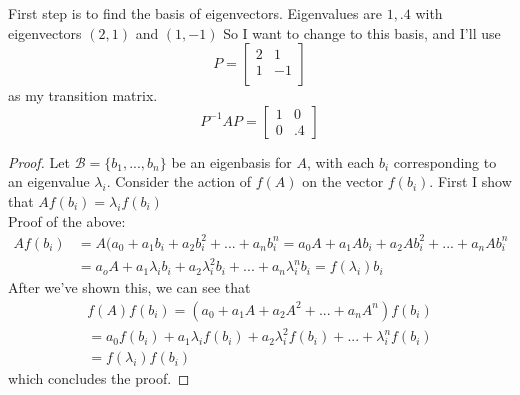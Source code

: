 \documentclass[12pt]{amsart}
\newenvironment{problem}[2][Problem]{\begin{trivlist}
\item[\hskip \labelsep {\bfseries #1}\hskip \labelsep {\bfseries #2.}]}{\end{trivlist}}
\begin{document}
\begin{problem}{13}
First step is to find the basis of eigenvectors. Eigenvalues are $1, .4$ with eigenvectors $(2, 1)$ and $(1, -1)$ So I want to change to this basis, and I'll use
$$
P = \begin{bmatrix}
2 & 1 \\
1 & -1\\
\end{bmatrix}
$$
as my transition matrix.
$$
P^{-1}AP = \begin{bmatrix}
1 & 0 \\
0 & .4
\end{bmatrix}
$$
\end{problem}

\begin{problem}{15}
\begin{proof}
Let $\mathcal{B} = \{b_1, ..., b_n\}$ be an eigenbasis for $A$, with each $b_i$ corresponding to an eigenvalue $\lambda_i$. Consider the action of $f(A)$ on the vector $f(b_i)$. First I show that $Af(b_i) = \lambda_i f(b_i)$ \\
Proof of the above:
\begin{align*}
Af(b_i) &= A(a_0 + a_1b_i + a_2b_i^2 +... +a_nb_i^n = a_0A + a_1Ab_i + a_2Ab_i^2 + ... +a_nAb_i^n \\
&= a_oA + a_1 \lambda_i b_i + a_2 \lambda_i^2 b_i +  ... + a_n \lambda_i^n b_i = f(\lambda_i)b_i
\end{align*}
After we've shown this, we can see that
\begin{align*}
f(A)f(b_i) = (a_0 + a_1A + a_2A^2 + ... + a_nA^n)f(b_i) \\
= a_0f(b_i) + a_1 \lambda_i f(b_i) + a_2 \lambda_i^2 f(b_i) + ... + \lambda_i^n f(b_i) \\
= f(\lambda_i)f(b_i)
\end{align*}
which concludes the proof.
\end{proof}
\end{problem}
\end{document}
